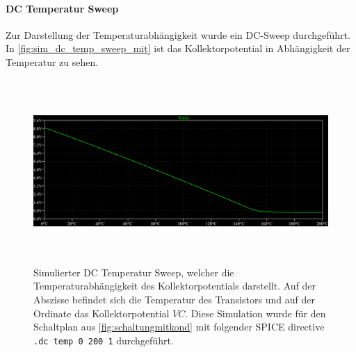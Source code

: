 \documentclass[12pt,english,ngerman]{scrartcl}
\begin{document}
\paragraph{DC Temperatur Sweep}
Zur Darstellung der Temperaturabhängigkeit wurde ein DC-Sweep durchgeführt. In \autoref{fig:sim_dc_temp_sweep_mit} ist das Kollektorpotential in Abhängigkeit der Temperatur zu sehen.
\begin{figure}[H]
  \centering
    \includegraphics[width=\linewidth, height=7cm]{./figures/mitkond/tempmitkondkollektorpot.png}
    \caption[Simulierter DC Temperatur Sweep mit
    Überbrückungskondensator]{Simulierter DC Temperatur Sweep, welcher die
      Temperaturabhängigkeit des Kollektorpotentials darstellt. Auf der
      Abszisse befindet sich die Temperatur des Transistors und auf der Ordinate
      das Kollektorpotential $VC$. Diese Simulation wurde für den
      Schaltplan aus \autoref{fig:schaltungmitkond} mit folgender SPICE
      directive \texttt{.dc temp 0 200 1} durchgeführt.
  }
  \label{fig:sim_dc_temp_sweep_mit}
\end{figure}

\end{document}
